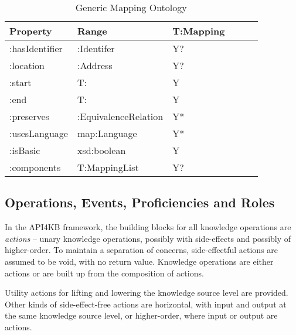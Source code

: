 \documentclass[runningheads]{llncs}
\begin{document}
\begin{table}[h]
\centering
\begin{tabular}{|l|l|l|l|l|l|}
 \hline
\textbf{Property} & \textbf{Range} & \textbf{T:Mapping}   \\ \hline
:hasIdentifier    & :Identifer     &  Y?                       \\ \hline
:location         & :Address       &  Y?                       \\ \hline
:start          & T:               &  Y                       \\ \hline
:end            & T:               &  Y                       \\ \hline
:preserves        & :EquivalenceRelation    &  Y*              \\ \hline
:usesLanguage     & map:Language    &  Y*              \\ \hline
:isBasic         & xsd:boolean     &  Y              \\ \hline
:components      & T:MappingList     &  Y?              \\ \hline
\end{tabular}
\caption{Generic Mapping Ontology}
\label{krmaponto}
\end{table}


\subsection{Operations, Events, Proficiencies and Roles}
\label{op}

In the API4KB framework, the building blocks for all knowledge operations are \emph{actions} -- unary knowledge operations, possibly with side-effects and possibly of higher-order. To maintain a separation of concerns, side-effectful actions are assumed to be void, with no return value. Knowledge operations are either actions or are built up from the composition of actions. 

Utility actions for lifting and lowering the knowledge source level are provided. Other kinds of side-effect-free actions are horizontal, with input and output at the same knowledge source level, or higher-order, where input or output are actions.
\end{document}
